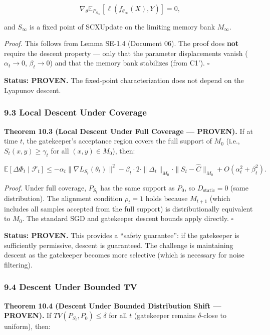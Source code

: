 \documentclass[
  12pt,
]{article}
\begin{document}
\[\nabla_\theta \mathbb{E}_{P_{S_\infty}}[\ell(f_{\theta_\infty}(X), Y)] = 0,\]

and \(S_\infty\) is a fixed point of SCXUpdate on the limiting memory
bank \(M_\infty\).

\emph{Proof.} This follows from Lemma SE-1.4 (Document 06). The proof
does \textbf{not} require the descent property --- only that the
parameter displacements vanish (\(\alpha_t \to 0\), \(\beta_t \to 0\))
and that the memory bank stabilizes (from C1'). \(\square\)

\textbf{Status: PROVEN.} The fixed-point characterization does not
depend on the Lyapunov descent.

\subsubsection{9.3 Local Descent Under
Coverage}\label{local-descent-under-coverage}

\textbf{Theorem 10.3 (Local Descent Under Full Coverage --- PROVEN).} If
at time \(t\), the gatekeeper's acceptance region covers the full
support of \(M_0\) (i.e., \(S_t(x,y) \geq \gamma_t\) for all
\((x,y) \in M_0\)), then:

\[\mathbb{E}[\Delta\Phi_t \mid \mathcal{F}_t] \leq -\alpha_t \|\nabla L_{S_t}(\theta_t)\|^2 - \beta_t \cdot 2 \cdot \|\Delta_t\|_{M_0} \cdot \|S_t - \hat{C}\|_{M_0} + O(\alpha_t^2 + \beta_t^2).\]

\emph{Proof.} Under full coverage, \(P_{S_t}\) has the same support as
\(P_0\), so \(D_{\text{static}} = 0\) (same distribution). The alignment
condition \(\rho_t = 1\) holds because \(M_{t+1}\) (which includes all
samples accepted from the full support) is distributionally equivalent
to \(M_0\). The standard SGD and gatekeeper descent bounds apply
directly. \(\square\)

\textbf{Status: PROVEN.} This provides a ``safety guarantee'': if the
gatekeeper is sufficiently permissive, descent is guaranteed. The
challenge is maintaining descent as the gatekeeper becomes more
selective (which is necessary for noise filtering).

\subsubsection{9.4 Descent Under Bounded
TV}\label{descent-under-bounded-tv}

\textbf{Theorem 10.4 (Descent Under Bounded Distribution Shift ---
PROVEN).} If \(TV(P_{S_t}, P_0) \leq \delta\) for all \(t\) (gatekeeper
remains \(\delta\)-close to uniform), then:
\end{document}
